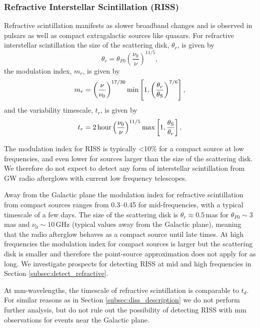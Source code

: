 \subsubsection{Refractive Interstellar Scintillation (RISS)}
Refractive scintillation manifests as slower broadband changes and is observed in pulsars as well as compact extragalactic sources like quasars. For refractive interstellar scintillation the size of the scattering disk, $\theta_r$, is given by
\begin{equation}
\theta_{r} = \theta_{F0} \left(\frac{\nu_0}{\nu} \right)^{11/5},
\label{eq:scattering_disk_refractive}
\end{equation}
the modulation index, $m_r$, is given by
\begin{equation}
m_r = \left(\frac{\nu}{\nu_0} \right)^{17/30} \min\left[1,\left(\frac{\theta_{r}}{\theta_{\rm S}} \right)^{7/6} \right],
\label{eq:mod_index_refractive}
\end{equation}
and the variability timescale, $t_r$, is given by
\begin{equation}
t_r = 2\,{\rm hour}\left(\frac{\nu_0}{\nu} \right)^{11/5} \max\left[1,\frac{\theta_{\rm S}}{\theta_{r}} \right].
\label{eq:timescale_refractive}
\end{equation}

The modulation index for RISS is typically <10\% for a compact source at low frequencies, and even lower for sources larger than the size of the scattering disk. We therefore do not expect to detect any form of interstellar scintillation from GW radio afterglows with current low frequency telescopes.

Away from the Galactic plane the modulation index for refractive scintillation from compact sources ranges from 0.3--0.45 for mid-frequencies, with a typical timescale of a few days. The size of the scattering disk is $\theta_r\approx 0.5$\,mas for $\theta_{F0}\sim3\,$mas and $\nu_0\sim10\,$GHz (typical values away from the Galactic plane), meaning that the radio afterglow behaves as a compact source until late times. At high frequencies the modulation index for compact sources is larger but the scattering disk is smaller and therefore the point-source approximation does not apply for as long. We investigate prospects for detecting RISS at mid and high frequencies in Section \ref{subsec:detect_refractive}.

At mm-wavelengths, the timescale of refractive scintillation is comparable to $t_d$. For similar reasons as in Section \ref{subsec:diss_description} we do not perform further analysis, but do not rule out the possibility of detecting RISS with mm observations for events near the Galactic plane.

